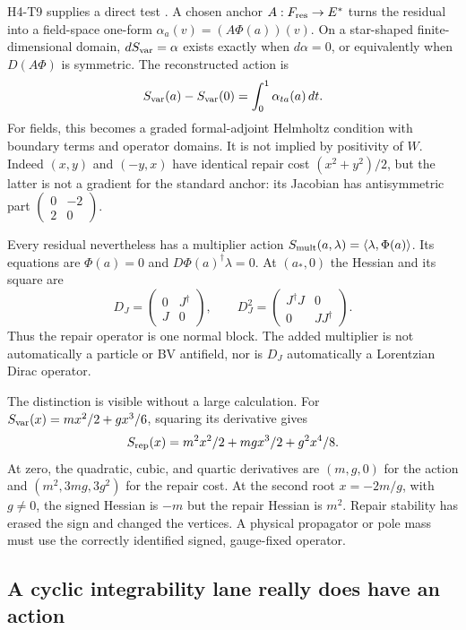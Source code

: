\documentclass[11pt]{article}
\begin{document}
H4-T9 supplies a direct test \cite{FrozenAnchor}. A chosen anchor
$A:F_{\rm res}\to E^*$ turns the residual into a field-space one-form
$\alpha_a(v)=(A\Phi(a))(v)$. On a star-shaped finite-dimensional domain,
$dS_{\rm var}=\alpha$ exists exactly when $d\alpha=0$, or equivalently
when $D(A\Phi)$ is symmetric. The reconstructed action is
\[
 S_{\rm var}(a)-S_{\rm var}(0)=\int_0^1\alpha_{ta}(a)\,dt.
\]
For fields, this becomes a graded formal-adjoint Helmholtz condition with
boundary terms and operator domains. It is not implied by positivity of $W$.
Indeed $(x,y)$ and $(-y,x)$ have identical repair cost
$(x^2+y^2)/2$, but the latter is not a gradient for the standard anchor:
its Jacobian has antisymmetric part
$\left(\begin{smallmatrix}0&-2\\2&0\end{smallmatrix}\right)$.

Every residual nevertheless has a multiplier action
$S_{\rm mult}(a,\lambda)=\langle\lambda,\Phi(a)\rangle$.
Its equations are $\Phi(a)=0$ and $D\Phi(a)^\dagger\lambda=0$.
At $(a_*,0)$ the Hessian and its square are
\[
 D_J=\begin{pmatrix}0&J^\dagger\\J&0\end{pmatrix},\qquad
 D_J^2=\begin{pmatrix}J^\dagger J&0\\0&JJ^\dagger\end{pmatrix}.
\]
Thus the repair operator is one normal block. The added multiplier is not
automatically a particle or BV antifield, nor is $D_J$ automatically a
Lorentzian Dirac operator.

The distinction is visible without a large calculation. For
$S_{\rm var}(x)=mx^2/2+gx^3/6$, squaring its derivative gives
\[
 S_{\rm rep}(x)=m^2x^2/2+mgx^3/2+g^2x^4/8.
\]
At zero, the quadratic, cubic, and quartic derivatives are $(m,g,0)$ for
the action and $(m^2,3mg,3g^2)$ for the repair cost. At the second root
$x=-2m/g$, with $g\ne0$, the signed Hessian is $-m$ but the repair
Hessian is $m^2$. Repair stability has erased the sign and changed the
vertices. A physical propagator or pole mass must use the correctly
identified signed, gauge-fixed operator.

\subsection{A cyclic integrability lane really does have an action}
\label{sec:cyclic-action}
\end{document}
